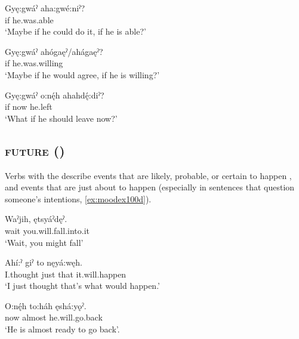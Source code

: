 \ea\label{ex:factualpref1} 
\ea
\gll Gyę:gwáˀ aha:gwé:niˀ?  \\
if he.was.able \\
\glt ‘Maybe if he could do it, if he is able?’

\ex
\gll Gyę:gwáˀ ahógaęˀ/ahágaęˀ? \\
if he.was.willing \\
\glt ‘Maybe if he would agree, if he is willing?’

\ex
\gll Gyę:gwáˀ o:nę́h ahahdę́:diˀ?\\
if now he.left \\
\glt ‘What if he should leave now?’ 
\z
\z

\subsection{ \textsc{future} ({\future})} \label{[ę-] future mood prefix}
Verbs with the  {\future} describe events that are likely, probable, or certain to happen , and events that are just about to happen (especially in sentences that question someone’s intentions, \ref{ex:moodex100d}). 

\ea\label{ex:moodex100} 
\ea\label{ex:moodex100a}
\gll Waˀjih, ętsyáˀdęˀ.\\
wait you.will.fall.into.it \\
\glt ‘Wait, you might fall’ 

\ex\label{ex:moodex100b}
\gll Ahí:ˀ giˀ to nęyá:węh. \\
I.thought just that it.will.happen\\
\glt ‘I just thought that’s what would happen.’ 

\ex\label{ex:moodex100c}
\gll O:nę́h to:háh ęshá:yǫˀ. \\
now almost he.will.go.back \\
\glt ‘He is almost ready to go back’. 

